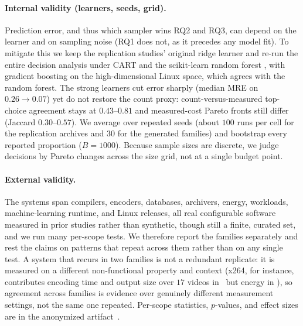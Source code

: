 \paragraph*{Internal validity (learners, seeds, grid).}
Prediction error, and thus which sampler wins RQ2 and RQ3, can depend on the
learner and on sampling noise (RQ1 does not, as it precedes any model fit). To
mitigate this we keep the replication studies' original ridge learner and re-run
the entire decision analysis under CART and the scikit-learn random forest
\cite{sklearn_api}, with gradient boosting on the high-dimensional Linux space,
which agrees with the random forest.
The strong learners cut error sharply (median MRE on \StudyReplicationICSE\
$0.26{\to}0.07$) yet do not restore the count proxy: count-versus-measured
top-choice agreement stays at $0.43$--$0.81$ and measured-cost Pareto fronts still
differ (Jaccard $0.30$--$0.57$). We average over repeated seeds (about $100$ runs
per cell for the replication archives and $30$ for the generated families) and
bootstrap every reported proportion ($B{=}1000$). Because sample sizes are
discrete, we judge decisions by Pareto changes across the size grid, not at a
single budget point.



\paragraph*{External validity.}
The systems span compilers, encoders, databases, archivers, energy, workloads,
machine-learning runtime, and Linux releases, all real configurable software
measured in prior studies rather than synthetic, though still a finite, curated
set, and we run many per-scope tests. We therefore report the families separately and rest
the claims on patterns that repeat across them rather than on any single test. A
system that recurs in two families is not a redundant replicate: it is measured on
a different non-functional property and context (x264, for instance, contributes
encoding time and output size over $17$ videos in \StudyReplicationICPE\ but
energy in \StudyEnergy), so agreement across families is evidence over genuinely
different measurement settings, not the same one repeated. Per-scope statistics,
$p$-values, and effect sizes are in the anonymized artifact~\cite{artifact}.
